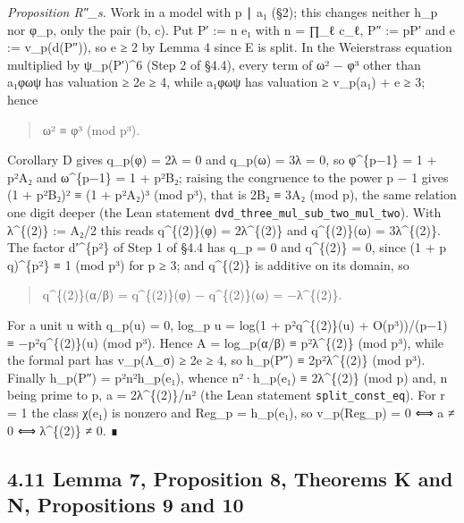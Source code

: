 \documentclass[11pt,a4paper]{article}
\theoremstyle{named}
\begin{document}
\textit{Proposition R″\_s.} Work in a model with p ∣ a₁ (§2); this changes neither h\_p nor φ\_p, only the pair (b, c). Put P′ := n e₁ with n = ∏\_ℓ c\_ℓ, P″ := pP′ and e := v\_p(d(P″)), so e ≥ 2 by Lemma 4 since E is split. In the Weierstrass equation multiplied by ψ\_p(P′)\textasciicircum{}6 (Step 2 of §4.4), every term of ω² − φ³ other than a₁φωψ has valuation ≥ 2e ≥ 4, while a₁φωψ has valuation ≥ v\_p(a₁) + e ≥ 3; hence

\begin{quote}
ω² ≡ φ³ (mod p³).
\end{quote}

Corollary D gives q\_p(φ) = 2λ = 0 and q\_p(ω) = 3λ = 0, so φ\textasciicircum{}\{p−1\} = 1 + p²A₂ and ω\textasciicircum{}\{p−1\} = 1 + p²B₂; raising the congruence to the power p − 1 gives (1 + p²B₂)² ≡ (1 + p²A₂)³ (mod p³), that is 2B₂ ≡ 3A₂ (mod p), the same relation one digit deeper (the Lean statement \texttt{dvd\_\allowbreak{}three\_\allowbreak{}mul\_\allowbreak{}sub\_\allowbreak{}two\_\allowbreak{}mul\_\allowbreak{}two}). With λ\textasciicircum{}\{(2)\} := A₂/2 this reads q\textasciicircum{}\{(2)\}(φ) = 2λ\textasciicircum{}\{(2)\} and q\textasciicircum{}\{(2)\}(ω) = 3λ\textasciicircum{}\{(2)\}. The factor d′\textasciicircum{}\{p²\} of Step 1 of §4.4 has q\_p = 0 and q\textasciicircum{}\{(2)\} = 0, since (1 + p q)\textasciicircum{}\{p²\} ≡ 1 (mod p³) for p ≥ 3; and q\textasciicircum{}\{(2)\} is additive on its domain, so

\begin{quote}
q\textasciicircum{}\{(2)\}(α/β) = q\textasciicircum{}\{(2)\}(φ) − q\textasciicircum{}\{(2)\}(ω) = −λ\textasciicircum{}\{(2)\}.
\end{quote}

For a unit u with q\_p(u) = 0, log\_p u = log(1 + p²q\textasciicircum{}\{(2)\}(u) + O(p³))/(p−1) ≡ −p²q\textasciicircum{}\{(2)\}(u) (mod p³). Hence A = log\_p(α/β) ≡ p²λ\textasciicircum{}\{(2)\} (mod p³), while the formal part has v\_p(Λ\_σ) ≥ 2e ≥ 4, so h\_p(P″) ≡ 2p²λ\textasciicircum{}\{(2)\} (mod p³). Finally h\_p(P″) = p²n²h\_p(e₁), whence n²·h\_p(e₁) ≡ 2λ\textasciicircum{}\{(2)\} (mod p) and, n being prime to p, a = 2λ\textasciicircum{}\{(2)\}/n² (the Lean statement \texttt{split\_\allowbreak{}const\_\allowbreak{}eq}). For r = 1 the class χ(e₁) is nonzero and Reg\_p = h\_p(e₁), so v\_p(Reg\_p) = 0 ⟺ a ≠ 0 ⟺ λ\textasciicircum{}\{(2)\} ≠ 0. ∎

\subsection*{4.11 Lemma 7, Proposition 8, Theorems K and N, Propositions 9 and 10}
\end{document}
